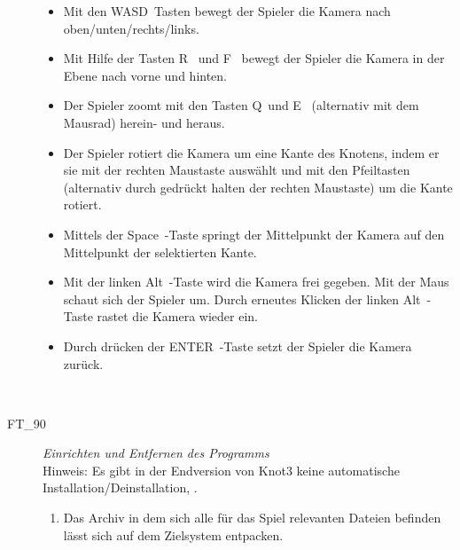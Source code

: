 \begin{description}
	\begin{itemize} 
	
        \item Mit den \glqq WASD\grqq~Tasten bewegt der Spieler die Kamera nach oben/unten/rechts/links.
        
        \item Mit Hilfe der Tasten \glqq R\grqq~ und \glqq F\grqq~ bewegt der Spieler die Kamera in der Ebene nach vorne und hinten.
        
        \item Der Spieler zoomt mit den Tasten \glqq Q\grqq~und \glqq E\grqq~ (alternativ mit dem Mausrad) herein- und heraus.
        
        \item Der Spieler rotiert die Kamera um eine Kante des Knotens, indem er sie mit der rechten Maustaste auswählt und mit den Pfeiltasten (alternativ durch gedrückt halten der rechten Maustaste) um die Kante rotiert.
        
        \item Mittels der \glqq Space\grqq~-Taste springt der Mittelpunkt der Kamera auf den Mittelpunkt der selektierten Kante.
        
        \item Mit der linken \glqq Alt\grqq~-Taste wird die Kamera frei gegeben. Mit der Maus schaut sich der Spieler um. Durch erneutes Klicken der linken \glqq Alt\grqq~-Taste rastet die Kamera wieder ein.
        
        \item Durch drücken der \glqq ENTER\grqq~-Taste setzt der Spieler die Kamera zurück.
        
        ~\\
		
		\end{itemize}
		
		

\label{FT:90}

	\item[FT\_90] \textit{Einrichten und Entfernen des Programms} \hfill\\

	Hinweis: Es gibt in der Endversion von Knot3 keine automatische Installation/Deinstallation, \hyperref[]{}.\\
		
	\begin{enumerate}

		\item Das Archiv in dem sich alle für das Spiel relevanten Dateien befinden lässt sich auf dem Zielsystem entpacken.
		

\end{enumerate}
\end{description}
